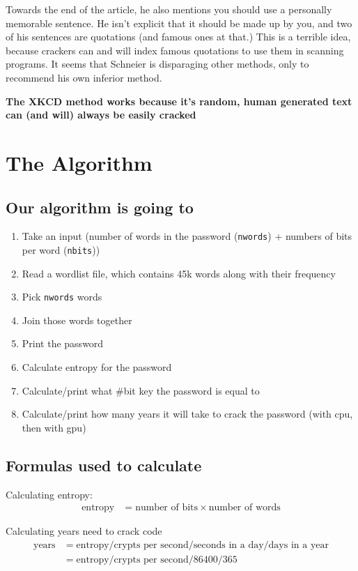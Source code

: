\documentclass{scrartcl}
\begin{document}
Towards the end of the article, he also mentions you should use a personally
memorable sentence. He isn’t explicit that it should be made up by you, and two
of his sentences are quotations (and famous ones at that.) This is a terrible
idea, because crackers can and will index famous quotations to use them in
scanning programs. It seems that Schneier is disparaging other methods, only to
recommend his own inferior method.

\textbf{The XKCD method works because it's random, human generated text can (and will) always be easily cracked}

\section{The Algorithm}
\label{sec:orga8a00c2}
\subsection{Our algorithm is going to}
\label{sec:org0aebbcb}
\begin{enumerate}
\item Take an input (number of words in the password (\texttt{nwords}) + numbers of bits per
word (\texttt{nbits}))
\item Read a wordlist file, which contains 45k words along with their frequency
\item Pick \texttt{nwords} words
\item Join those words together
\item Print the password
\item Calculate entropy for the password
\item Calculate/print what \#bit key the password is equal to
\item Calculate/print how many years it will take to crack the password (with cpu,
then with gpu)
\end{enumerate}

\subsection{Formulas used to calculate}
\label{sec:org6339317}
Calculating entropy:
\begin{align*}
\text{entropy}&=\text{number of bits}\times\text{number of words}
\end{align*}

Calculating years need to crack code
\begin{align*}
\text{years}&=\text{entropy}/\text{crypts per second}/\text{seconds in a day}/\text{days in a year}\\
&=\text{entropy}/\text{crypts per second}/86400/365
\end{align*}
\end{document}
